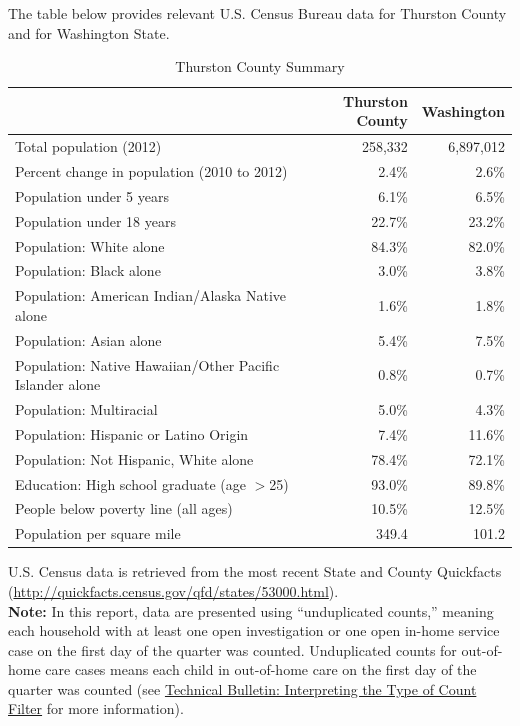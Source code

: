 \documentclass{article}\usepackage[]{graphicx}\usepackage[]{color}
\begin{document}
The table below provides relevant U.S. Census Bureau data for Thurston County and for Washington State. 
\nopagebreak[3]
\begin{table}[ht]
\centering
\caption{Thurston County Summary} 
\begin{tabular}{lrr}
  \toprule
 & Thurston County & Washington \\ 
  \midrule
Total population (2012) & 258,332 & 6,897,012 \\ 
  Percent change in population (2010 to 2012) & 2.4\% & 2.6\% \\ 
  Population under 5 years & 6.1\% & 6.5\% \\ 
  Population under 18 years & 22.7\% & 23.2\% \\ 
  Population: White alone & 84.3\% & 82.0\% \\ 
  Population: Black alone & 3.0\% & 3.8\% \\ 
  Population: American Indian/Alaska Native alone & 1.6\% & 1.8\% \\ 
  Population: Asian alone & 5.4\% & 7.5\% \\ 
  Population: Native Hawaiian/Other Pacific Islander alone & 0.8\% & 0.7\% \\ 
  Population: Multiracial & 5.0\% & 4.3\% \\ 
  Population: Hispanic or Latino Origin & 7.4\% & 11.6\% \\ 
  Population: Not Hispanic, White alone & 78.4\% & 72.1\% \\ 
  Education: High school graduate (age $>$25) & 93.0\% & 89.8\% \\ 
  People below poverty line (all ages) & 10.5\% & 12.5\% \\ 
  Population per square mile & 349.4 & 101.2 \\ 
   \bottomrule
\end{tabular}
\end{table}


U.S. Census data is retrieved from the most recent State and County Quickfacts (\href{http://quickfacts.census.gov/qfd/states/53000.html}{http://quickfacts.census.gov/qfd/states/53000.html}).\\

\textbf{Note:} In this report, data are presented using ``unduplicated counts,'' meaning each household with at least one open investigation or one open in-home service case on the first day of the quarter was counted. Unduplicated counts for out-of-home care cases means each child in out-of-home care on the first day of the quarter was counted (see \href{http://http://www.partnersforourchildren.org/publications/using-different-count-types-data-portal}{Technical Bulletin: Interpreting the Type of Count Filter} for more information).  
\end{document}
